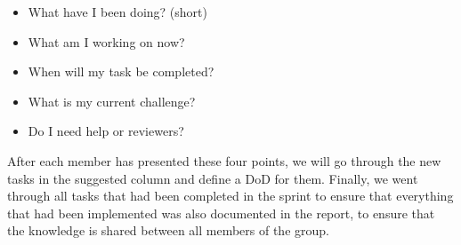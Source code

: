 \begin{itemize}
	\item{What have I been doing? (short)}
	\item{What am I working on now?}
	\item{When will my task be completed?}
	\item{What is my current challenge?}
	\item{Do I need help or reviewers?}
\end{itemize}
\noindent
After each member has presented these four points, we will go through the new tasks in the suggested column and define a DoD for them.
Finally, we went through all tasks that had been completed in the sprint to ensure that everything that had been implemented was also documented in the report, to ensure that the knowledge is shared between all members of the group.
